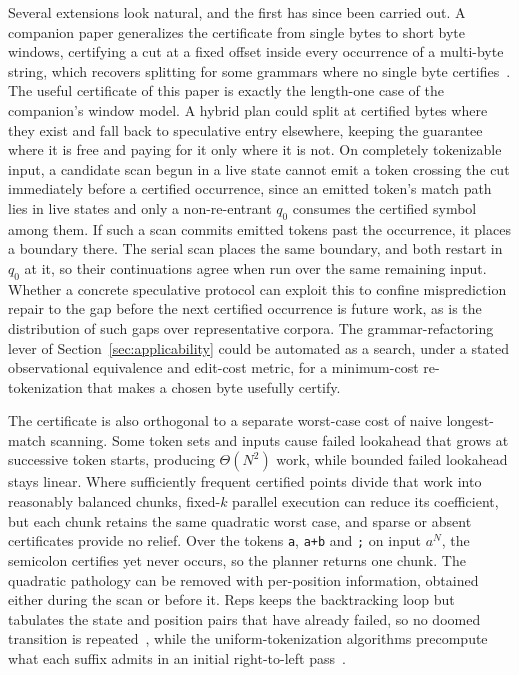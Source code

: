 \documentclass[11pt,a4paper]{article}
\theoremstyle{definition}
\theoremstyle{plain}
\newcommand{\code}[1]{\texttt{#1}}
\begin{document}
Several extensions look natural, and the first has since been carried out. A companion paper generalizes the certificate
from single bytes to short byte windows, certifying a cut at a fixed offset inside every occurrence of a multi-byte
string, which recovers splitting for some grammars where no single byte certifies~\cite{nidhogg2026splitwindows}. The
useful certificate of this paper is exactly the length-one case of the companion's window model. A hybrid plan could
split at certified bytes where they exist and fall back to speculative entry elsewhere, keeping the guarantee where it
is free and paying for it only where it is not. On completely tokenizable input, a candidate scan begun in a live state
cannot emit a token crossing the cut immediately before a certified occurrence, since an emitted token's match path lies
in live states and only a non-re-entrant $q_0$ consumes the certified symbol among them. If such a scan commits emitted
tokens past the occurrence, it places a boundary there. The serial scan places the same boundary, and both restart in
$q_0$ at it, so their continuations agree when run over the same remaining input. Whether a concrete speculative
protocol can exploit this to confine misprediction repair to the gap before the next certified occurrence is future
work, as is the distribution of such gaps over representative corpora. The grammar-refactoring lever of
Section~\ref{sec:applicability} could be automated as a search, under a stated observational equivalence and edit-cost
metric, for a minimum-cost re-tokenization that makes a chosen byte usefully certify.

The certificate is also orthogonal to a separate worst-case cost of naive longest-match scanning. Some token sets and
inputs cause failed lookahead that grows at successive token starts, producing $\Theta(N^2)$ work, while bounded failed
lookahead stays linear. Where sufficiently frequent certified points divide that work into reasonably balanced chunks,
fixed-$k$ parallel execution can reduce its coefficient, but each chunk retains the same quadratic worst case, and
sparse or absent certificates provide no relief. Over the tokens \code{a}, \code{a+b} and \code{;} on input $a^N$, the
semicolon certifies yet never occurs, so the planner returns one chunk. The quadratic pathology can be removed with
per-position information, obtained either during the scan or before it. Reps keeps the backtracking loop but tabulates
the state and position pairs that have already failed, so no doomed transition is repeated~\cite{reps1998maximal}, while
the uniform-tokenization algorithms precompute what each suffix admits in an initial right-to-left
pass~\cite{li2025uniform}.
\end{document}
